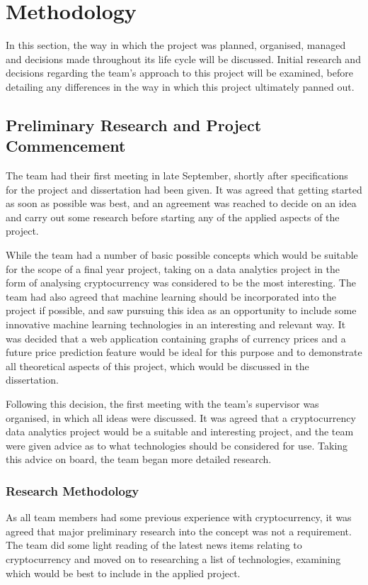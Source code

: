 \section{Methodology}\label{secmethodology}
In this section, the way in which the project was planned, organised, managed and decisions made throughout its life cycle will be discussed. Initial research and decisions regarding the team's approach to this project will be examined, before detailing any differences in the way in which this project ultimately panned out.

\subsection{Preliminary Research and Project Commencement}\label{prelim}
The team had their first meeting in late September, shortly after specifications for the project and dissertation had been given. It was agreed that getting started as soon as possible was best, and an agreement was reached to decide on an idea and carry out some research before starting any of the applied aspects of the project. 

While the team had a number of basic possible concepts which would be suitable for the scope of a final year project, taking on a data analytics project in the form of analysing cryptocurrency was considered to be the most interesting. The team had also agreed that machine learning should be incorporated into the project if possible, and saw pursuing this idea as an opportunity to include some innovative machine learning technologies in an interesting and relevant way. It was decided that a web application containing graphs of currency prices and a future price prediction feature would be ideal for this purpose and to demonstrate all theoretical aspects of this project, which would be discussed in the dissertation.

Following this decision, the first meeting with the team's supervisor was organised, in which all ideas were discussed. It was agreed that a cryptocurrency data analytics project would be a suitable and interesting project, and the team were given advice as to what technologies should be considered for use. Taking this advice on board, the team began more detailed research.

\subsubsection{Research Methodology}\label{secresearchmeth}
As all team members had some previous experience with cryptocurrency, it was agreed that major preliminary research into the concept was not a requirement. The team did some light reading of the latest news items relating to cryptocurrency and moved on to researching a list of technologies, examining which would be best to include in the applied project.

